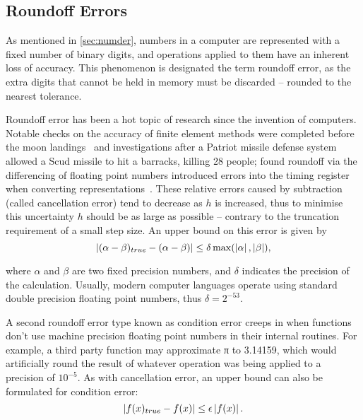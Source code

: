 \subsection{Roundoff Errors}\label{subsec:roundoff}

As mentioned in \cref{sec:numder}, numbers in a computer are represented with a fixed number of binary digits, and operations applied to them have an inherent loss of accuracy.
This phenomenon is designated the term roundoff error, as the extra digits that cannot be held in memory must be discarded -- rounded to the nearest tolerance.

Roundoff error has been a hot topic of research since the invention of computers.
Notable checks on the accuracy of finite element methods were completed before the moon landings~\cite{Cyrus1968} and investigations after a Patriot missile defense system allowed a Scud missile to hit a barracks, killing 28 people; found roundoff via the differencing of floating point numbers introduced errors into the timing register when converting representations~\cite{Skeel1992}.
These relative errors caused by subtraction (called cancellation error) tend to decrease as $h$ is increased, thus to minimise this uncertainty $h$ should be as large as possible -- contrary to the truncation requirement of a small step size.
An upper bound on this error is given by
\begin{equation}
 \left\lvert (\alpha-\beta)_{true} - (\alpha-\beta)\right\rvert \leq \delta \max(\left\lvert \alpha\right\rvert,\left\lvert \beta\right\rvert),
\end{equation}

where $\alpha$ and $\beta$ are two fixed precision numbers, and $\delta$ indicates the precision of the calculation.
Usually, modern computer languages operate using standard double precision floating point numbers, thus $\delta = 2^{-53}$.

A second roundoff error type known as condition error creeps in when functions don't use machine precision floating point numbers in their internal routines.
For example, a third party function may approximate π to 3.14159, which would artificially round the result of whatever operation was being applied to a precision of $10^{-5}$.
As with cancellation error, an upper bound can also be formulated for condition error:
\begin{equation}
\left\lvert f(x)_{true} - f(x)\right\rvert\leq \epsilon \left\lvert f(x)\right\rvert.
\end{equation}

